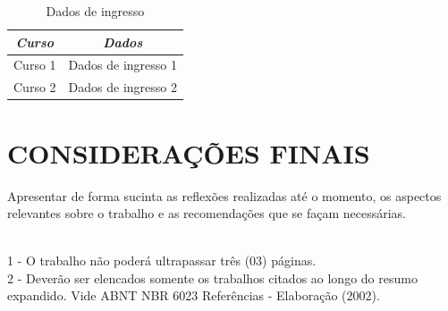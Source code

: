 \documentclass{furgmpu}
\begin{document}
    \begin{table}[ht]
        \centering
        \caption{Dados de ingresso}
        \begin{tabular}{cc}
            \toprule
            \textbf{\textit{Curso}}  & \textbf{\textit{Dados}} \\
            \midrule
            Curso 1 & Dados de ingresso 1\\
            Curso 2 & Dados de ingresso 2\\
            \bottomrule
        \end{tabular}
        \label{tab:tabela}
    \end{table}
    
    
    \section{CONSIDERAÇÕES FINAIS}
    Apresentar de forma sucinta as reflexões realizadas até o momento, os aspectos relevantes sobre o trabalho e as recomendações que se façam necessárias.
    
    

     \\
    1 - O trabalho não poderá ultrapassar três (03) páginas.\\
    2 - Deverão ser elencados somente os trabalhos citados ao longo do resumo expandido. Vide ABNT NBR 6023 Referências - Elaboração (2002). 
\end{document}
